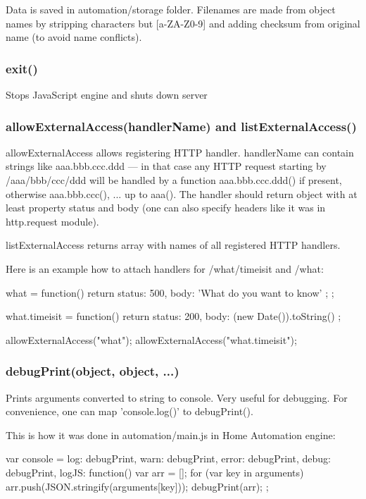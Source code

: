 Data is saved in automation/storage folder. Filenames are made from object names by 
stripping characters but [a-ZA-Z0-9] and adding checksum from original name (to avoid name conflicts).

\subsubsection{exit()}
Stops JavaScript engine and shuts down \zway server


\subsubsection{allowExternalAccess(handlerName) and listExternalAccess()}
allowExternalAccess allows registering HTTP handler. handlerName can contain strings like 
aaa.bbb.ccc.ddd --- in that case any HTTP request starting by /aaa/bbb/ccc/ddd will be 
handled by a function aaa.bbb.ccc.ddd() if present, otherwise aaa.bbb.ccc(), ... up to aaa().
The handler should return object with at least property status and body (one can also specify 
headers like it was in http.request module).

listExternalAccess returns array with names of all registered HTTP handlers.

Here is an example how to attach handlers for /what/timeisit and /what:

\begin{listingverbatim}
what = function() {
  return { status: 500, body: 'What do you want to know' };
};

what.timeisit = function() {
  return { status: 200, body: (new Date()).toString() }
};

allowExternalAccess("what");
allowExternalAccess("what.timeisit");
\end{listingverbatim}

\subsubsection{debugPrint(object, object, ...)}

Prints arguments converted to string to \zway console. Very useful for debugging.
For convenience, one can map 'console.log()' to debugPrint().

This is how it was done in automation/main.js in \zway Home Automation engine:
\begin{listingverbatim}
var console = {
    log: debugPrint,
    warn: debugPrint,
    error: debugPrint,
    debug: debugPrint,
    logJS: function() {
        var arr = [];
        for (var key in arguments)
            arr.push(JSON.stringify(arguments[key]));
        debugPrint(arr);
    }
};
\end{listingverbatim}

